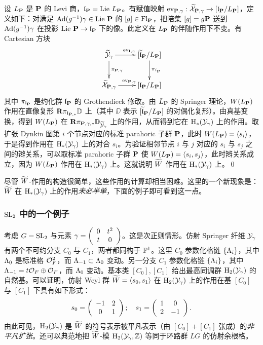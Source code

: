 设 $L_{\mathbf{P}}$ 是 $\mathbf{P}$ 的 Levi 商，$\mathfrak{l}_{\mathbf{P}}=\textup{Lie}\  L_{\mathbf{P}}$。有赋值映射 $\textup{ev}_{\mathbf{P},\gamma}: \widetilde{\mathcal{X}}_{\mathbf{P},\gamma}\to [\mathfrak{l}_{\mathbf{P}}/L_{\mathbf{P}}]$，定义如下：对满足 $\textup{Ad}(g^{-1})\gamma\in\textup{Lie}\  \mathbf{P}$ 的 $[g]\in\textup{Fl}_{\mathbf{P}}$，把陪集 $[g]=g\mathbf{P}$ 送到 $\textup{Ad}(g^{-1})\gamma$ 在投影 $\textup{Lie}\  \mathbf{P}\to\mathfrak{l}_{\mathbf{P}}$ 下的像。此定义在 $L_{\mathbf{P}}$ 的伴随作用下不变。有 Cartesian 方块
\begin{equation*}
\xymatrix{\tY_{\gamma}\ar[d]^{\pi_{\bP,\gamma}}\ar[r]^{\ev_{\bI,\gamma}} & [\wt{\frl}_{\bP}/L_{\bP}]\ar[d]^{\pi_{\frl_{\bP}}}\\
\tX_{\bP,\gamma}\ar[r]^{\ev_{\bP,\gamma}} & [\frl_{\bP}/L_{\bP}]}
\end{equation*}
其中 $\pi_{\mathfrak{l}_{\mathbf{P}}}$ 是约化群 $\mathfrak{l}_{\mathbf{P}}$ 的 Grothendieck 修改。由 $L_{\mathbf{P}}$ 的 Springer 理论，$W(L_{\mathbf{P}})$ 作用在直像复形 $\mathbf{R}\pi_{\mathfrak{l}_{\mathbf{P},*}}\mathbb{D}$ 上（其中 $\DD$ 表示 $[\widetilde{\mathfrak{l}}_{\mathbf{P}}/L_{\mathbf{P}}]$ 的对偶化复形）。由真基变换，得到 $W(L_{\mathbf{P}})$ 在 $\mathbf{R}\pi_{\mathbf{P},\gamma,*}\mathbb{D}_{\widetilde{\mathcal{Y}}_{\gamma}}$ 上的作用，从而得到它在 $\textup{H}_{*}({\mathcal{Y}_{\gamma}})$ 上的作用。取扩张 Dynkin 图第 $i$ 个节点对应的标准 parahoric 子群 $\mathbf{P}$，此时 $W(L_{\mathbf{P}})=\langle{s_{i}}\rangle$，于是得到作用在 $\textup{H}_{*}({\mathcal{Y}_{\gamma}})$ 上的对合 $s_{i}$。为验证相邻节点 $i$ 与 $j$ 对应的 $s_{i}$ 与 $s_{j}$ 之间的辫关系，可以取标准 parahoric 子群 $\mathbf{P}$ 使 $W(L_{\mathbf{P}})=\langle{s_{i},s_{j}}\rangle$，此时辫关系成立，因为 $W(L_{\mathbf{P}})$ 作用在 $\textup{H}_{*}({\mathcal{Y}_{\gamma}})$ 上。这就说明 $\widetilde{W}$ 作用在 $\textup{H}_{*}({\mathcal{Y}_{\gamma}})$ 上。\qed

尽管 $\widetilde{W}$-作用的构造很简单，这些作用的计算却相当困难。这里的一个新现象是：$\widetilde{W}$ 在 $\textup{H}_{*}({\mathcal{Y}_{\gamma}})$ 上的作用{\em 未必半单}，下面的例子即可看到这一点。

\subsubsection{$\textup{SL}_{2}$ 中的一个例子}\label{sss:tilW SL2 ram} 考虑 $G=\textup{SL}_{2}$ 与元素 $\gamma=\left(\begin{array}{cc} 0 & t^{2} \\ t & 0 \end{array}\right)$。这是次正则情形。仿射 Springer 纤维 $\mathcal{Y}_{\gamma}$ 有两个不可约分支 $C_{0}$ 与 $C_{1}$，两者都同构于 $\mathbb{P}^{1}$。这里 $C_{0}$ 参数化格链 $\{\Lambda_{i}\}$，其中 $\Lambda_{0}$ 是标准格 $\mathcal{O}^{2}_{F}$，而 $\Lambda_{-1}\subset \Lambda_{0}$ 变动。另一分支 $C_{1}$ 参数化格链 $\{\Lambda_{i}\}$，其中 $\Lambda_{-1}=t\mathcal{O}_{F}\oplus\mathcal{O}_{F}$，而 $\Lambda_{0}$ 变动。基本类 $[C_{0}], [C_{1}]$ 给出最高同调群 $\textup{H}_{2}({\mathcal{Y}_{\gamma}})$ 的自然基。可以证明，仿射 Weyl 群 $\widetilde{W}=\langle{s_{0},s_{1}}\rangle$ 在 $\textup{H}_{2}({\mathcal{Y}_{\gamma}})$ 上的作用在基 $[C_{0}]$ 与 $[C_{1}]$ 下具有如下形式：
\begin{equation*}
s_{0}=\left(\begin{array}{cc} -1 & 2 \\ 0 & 1 \end{array}\right); \quad s_{1}=\left(\begin{array}{cc} 1 & 0 \\ 2 & -1 \end{array}\right).
\end{equation*}
由此可见，$\textup{H}_{2}({\mathcal{Y}_{\gamma}})$ 是 $\widetilde{W}$ 的符号表示被平凡表示（由 $[C_{0}]+[C_{1}]$ 张成）的{\em 非平凡扩张}。还可以典范地把 $\widetilde{W}$-模 $\textup{H}_{2}({\mathcal{Y}_{\gamma},\mathbb{Z}})$ 等同于环路群 $LG$ 的仿射余根格。

